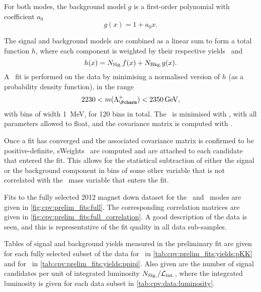 For both modes, the background model $g$ is a first-order polynomial with 
coefficient $a_{0}$
\begin{equation}
  g(x) = 1 + a_{0}x.
  \label{eqn:cpv:prelim_fits:bkg_model}
\end{equation}

The signal and background models are combined as a linear sum to form a total 
function $h$, where each component is weighted by their respective yields 
\nsig\ and \nbkg
\begin{equation}
  h(x) = N_{\text{Sig.}} f(x) + N_{\text{Bkg.}} g(x).
\end{equation}
A \chisq\ fit is performed on the data by minimising a normalised version of 
$h$ (as a probability density function), in the range
\begin{equation}
  2230 < m(\PLambdac) < \SI{2350}{\GeV},
\end{equation}
with bins of width \SI{1}{\MeV}, for 120 bins in total.
The \chisq\ is minimised with \minuit, with all parameters allowed to float, 
and the covariance matrix is computed with \hesse.

Once a fit has converged and the associated covariance matrix is confirmed to 
be positive-definite, sWeights~\cite{Pivk:2004ty} are computed and are attached 
to each candidate that entered the fit.
This allows for the statistical subtraction of either the signal or the 
background component in bins of some other variable that is not correlated with 
the \PLambdac\ mass variable that enters the fit.

Fits to the fully selected 2012 magnet down dataset for the \pKK\ and \ppipi\ 
modes are given in \cref{fig:cpv:prelim_fits:full}.
The corresponding correlation matrices are given in 
\cref{fig:cpv:prelim_fits:full_correlation}.
A good description of the data is seen, and this is representative of the fit 
quality in all data sub-samples.

Tables of signal and background yields measured in the preliminary fit are 
given for each fully selected subset of the data for \pKK\ in 
\cref{tab:cpv:prelim_fits:yields:pKK} and for \ppipi\ in 
\cref{tab:cpv:prelim_fits:yields:ppipi}.
Also given are the number of signal candidates per unit of integrated 
luminosity $N_{\text{Sig.}}/\mathcal{L}_{\textnormal{int.}}$, where the integrated luminosity is given for each 
data subset in \cref{tab:cpv:data:luminosity}.


